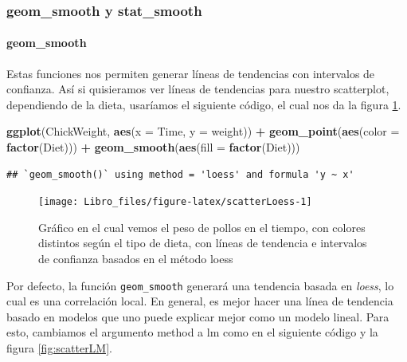 \documentclass[]{book}
\newenvironment{Shaded}{\begin{snugshade}}{\end{snugshade}}
\newcommand{\DataTypeTok}[1]{\textcolor[rgb]{0.13,0.29,0.53}{#1}}
\newcommand{\KeywordTok}[1]{\textcolor[rgb]{0.13,0.29,0.53}{\textbf{#1}}}
\newcommand{\NormalTok}[1]{#1}
\newcommand{\OperatorTok}[1]{\textcolor[rgb]{0.81,0.36,0.00}{\textbf{#1}}}
\newcommand{\StringTok}[1]{\textcolor[rgb]{0.31,0.60,0.02}{#1}}
\let\oldparagraph\paragraph
\renewcommand{\paragraph}[1]{\oldparagraph{#1}\mbox{}}
\begin{document}
\hypertarget{geom_smooth-y-stat_smooth}{%
\subsubsection{geom\_smooth y
stat\_smooth}\label{geom_smooth-y-stat_smooth}}

\hypertarget{geom_smooth}{%
\paragraph{geom\_smooth}\label{geom_smooth}}

Estas funciones nos permiten generar líneas de tendencias con intervalos
de confianza. Así si quisieramos ver líneas de tendencias para nuestro
scatterplot, dependiendo de la dieta, usaríamos el siguiente código, el
cual nos da la figura \ref{fig:scatterLoess}.

\begin{Shaded}
\begin{Highlighting}[]
\KeywordTok{ggplot}\NormalTok{(ChickWeight, }\KeywordTok{aes}\NormalTok{(}\DataTypeTok{x =}\NormalTok{ Time, }\DataTypeTok{y =}\NormalTok{ weight)) }\OperatorTok{+}\StringTok{ }\KeywordTok{geom_point}\NormalTok{(}\KeywordTok{aes}\NormalTok{(}\DataTypeTok{color =} \KeywordTok{factor}\NormalTok{(Diet))) }\OperatorTok{+}\StringTok{ }
\StringTok{    }\KeywordTok{geom_smooth}\NormalTok{(}\KeywordTok{aes}\NormalTok{(}\DataTypeTok{fill =} \KeywordTok{factor}\NormalTok{(Diet)))}
\end{Highlighting}
\end{Shaded}

\begin{verbatim}
## `geom_smooth()` using method = 'loess' and formula 'y ~ x'
\end{verbatim}

\begin{figure}

{\centering \texttt{[image: Libro\_files/figure-latex/scatterLoess-1]} 

}

\caption{Gráfico en el cual vemos el peso de pollos en el tiempo, con colores distintos según el tipo de dieta, con líneas de tendencia e intervalos de confianza basados en el método loess}\label{fig:scatterLoess}
\end{figure}

Por defecto, la función \texttt{geom\_smooth} generará una tendencia
basada en \emph{loess}, lo cual es una correlación local. En general, es
mejor hacer una línea de tendencia basado en modelos que uno puede
explicar mejor como un modelo lineal. Para esto, cambiamos el argumento
method a lm como en el siguiente código y la figura \ref{fig:scatterLM}.
\end{document}
